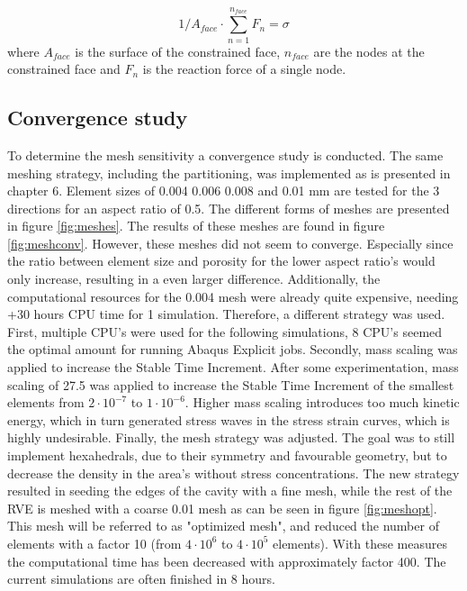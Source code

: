 \begin{equation} \label{eqn:RVESS}
1/A_{face}\cdot\sum_{n=1}^ {n_{face}} F_n= \sigma
\end{equation}where $A_{face}$ is the surface of the constrained face, $n_{face}$ are the nodes at the constrained face and $F_n$ is the reaction force of a single node.

\subsection{Convergence study}
To determine the mesh sensitivity a convergence study is conducted. The same meshing strategy, including the partitioning, was implemented as is presented in chapter 6. Element sizes of 0.004 0.006 0.008 and 0.01 mm are tested for the 3 directions for an aspect ratio of 0.5. The different forms of meshes are presented in figure \ref{fig:meshes}. The results of these meshes are found in figure \ref{fig:meshconv}. However, these meshes did not seem to converge. Especially since the ratio between element size and porosity for the lower aspect ratio's would only increase, resulting in a even larger difference.  Additionally, the computational resources for the 0.004 mesh were already quite expensive, needing +30 hours CPU time for 1 simulation. Therefore, a different strategy was used. First, multiple CPU's were used for the following simulations, 8 CPU's seemed the optimal amount for running Abaqus Explicit jobs. 
Secondly, mass scaling was applied to increase the Stable Time Increment. After some experimentation, mass scaling of 27.5 was applied to increase the Stable Time Increment of the smallest elements from $2\cdot10^{-7}$ to $1\cdot10^{-6}$. Higher mass scaling introduces too much kinetic energy, which in turn generated stress waves in the stress strain curves, which is highly undesirable. Finally, the mesh strategy was adjusted. The goal was to still implement hexahedrals, due to their symmetry and favourable geometry, but to decrease the density in the area's without stress concentrations. The new strategy resulted in seeding the edges of the cavity with a fine mesh, while the rest of the RVE is meshed with a coarse 0.01 mesh as can be seen in figure \ref{fig:meshopt}. This mesh will be referred to as "optimized mesh", and reduced the number of elements with a factor 10 (from $4\cdot 10^6$ to $4 \cdot 10^5$ elements). With these measures the computational time has been decreased with approximately factor  400. The current simulations are often finished in 8 hours. 

